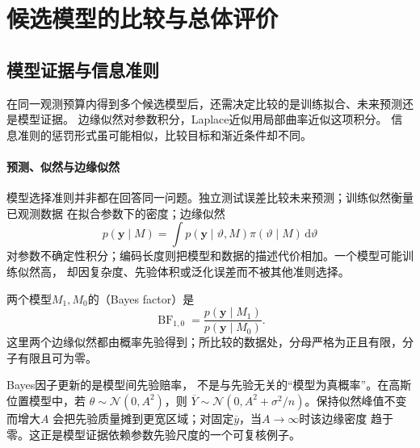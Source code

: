 \section{候选模型的比较与总体评价}
\label{sec:stats-model-comparison-data-acquisition}
\subsection{模型证据与信息准则}
\label{sec:statistics-model-evidence}
在同一观测预算内得到多个候选模型后，还需决定比较的是训练拟合、未来预测还是模型证据。
边缘似然对参数积分，Laplace近似用局部曲率近似这项积分。
信息准则的惩罚形式虽可能相似，比较目标和渐近条件却不同。

\paragraph{预测、似然与边缘似然}
模型选择准则并非都在回答同一问题。独立测试误差比较未来预测；训练似然衡量已观测数据
在拟合参数下的密度；边缘似然
\[
  p(\bm y\mid M)
  =\int p(\bm y\mid\vartheta,M)\pi(\vartheta\mid M)\,\mathrm d\vartheta
\]
对参数不确定性积分；编码长度则把模型和数据的描述代价相加。一个模型可能训练似然高，
却因复杂度、先验体积或泛化误差而不被其他准则选择。

\begin{definition}[Bayes因子]
  \label{def:statistics-bayes-factor}
两个模型\(M_1,M_0\)的（Bayes factor）是
\[
  \operatorname{BF}_{1,0}
  =\frac{p(\bm y\mid M_1)}{p(\bm y\mid M_0)}.
\]
这里两个边缘似然都由概率先验得到；所比较的数据处，分母严格为正且有限，分子有限且可为零。
\end{definition}
Bayes因子更新的是模型间先验赔率，
不是与先验无关的“模型为真概率”。在高斯位置模型中，若
\(\theta\sim\mathcal N(0,A^2)\)，则
\(\overline Y\sim\mathcal N(0,A^2+\sigma^2/n)\)。保持似然峰值不变而增大\(A\)
会把先验质量摊到更宽区域；对固定\(\overline y\)，当\(A\to\infty\)时该边缘密度
趋于零。这正是模型证据依赖参数先验尺度的一个可复核例子。

